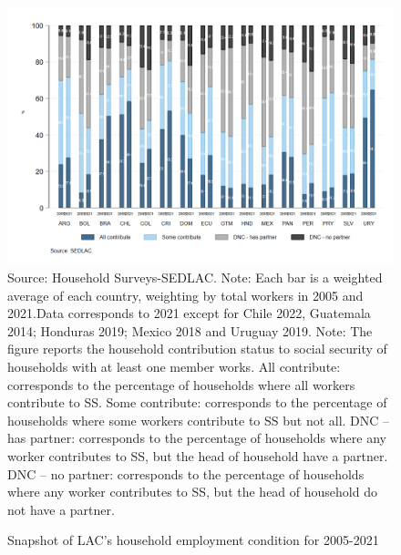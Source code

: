 \documentclass[english]{article}
\begin{document}
\begin{landscape}
\begin{figure}[!htb]
    \centering
    \caption{Snapshot of LAC’s household employment condition for 2005-2021}     
    \includegraphics[scale=.45]{latex/figures/Household/snapshot_household_2005-2021.png}
    \label{fig:Household20052021}
    \justifying
    \footnotesize{Source: Household Surveys-SEDLAC.}
    \footnotesize{Note: Each bar is a weighted average of each country, weighting by total workers in 2005 and 2021.Data corresponds to 2021 except for Chile 2022, Guatemala 2014; Honduras 2019; Mexico 2018 and Uruguay 2019.}
    \footnotesize{Note: The figure reports the household contribution status to social security of households with at least one member works.   All contribute: corresponds to the percentage of households where all workers contribute to SS. Some contribute: corresponds to the percentage of households where some workers contribute to SS but not all. DNC – has partner: corresponds to the percentage of households where any worker contributes to SS, but the head of household have a partner. DNC – no partner: corresponds to the percentage of households where any worker contributes to SS, but the head of household do not have a partner.}
\end{figure}
\end{landscape}
\end{document}
